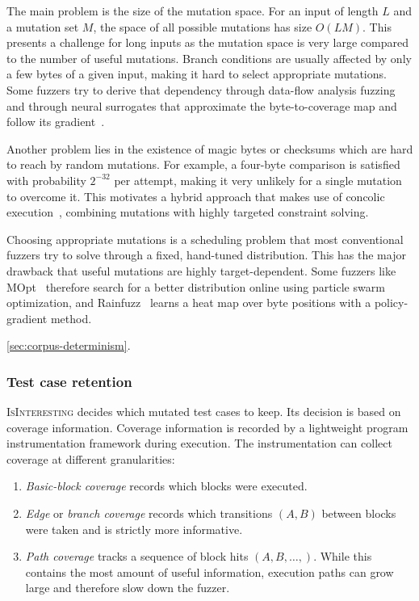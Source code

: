 The main problem is the size of the mutation space.
For an input of length $L$ and a mutation set $M$, the space of all possible mutations has size $O(LM)$.
This presents a challenge for long inputs as the mutation space is very large compared to the number of useful mutations.
Branch conditions are usually affected by only a few bytes of a given input, making it hard to select appropriate mutations.
Some fuzzers try to derive that dependency through data-flow analysis
fuzzing~\cite{gan_greyone_nodate} and through neural surrogates that approximate the
byte-to-coverage map and follow its gradient~\cite{she_neuzz_2019,she_mtfuzz_2020}.

Another problem lies in the existence of magic bytes or checksums which are hard to reach by random mutations.
For example, a four-byte comparison is satisfied with probability $2^{-32}$ per attempt, making it very unlikely for a single mutation to overcome it.
This motivates a hybrid approach that makes use of concolic execution~\cite{stephens_driller_2016}, combining mutations with highly targeted constraint solving.

Choosing appropriate mutations is a scheduling problem that most conventional fuzzers try to solve through a fixed, hand-tuned distribution.
This has the major drawback that useful mutations are highly target-dependent.
Some fuzzers like MOpt~\cite{lyu_mopt_nodate} therefore search for a better distribution online using particle swarm
optimization, and Rainfuzz~\cite{binosi_rainfuzz_2023} learns a heat map over byte positions with
a policy-gradient method.

\cref{sec:corpus-determinism}.

\subsubsection{Test case retention}

\textsc{IsInteresting} decides which mutated test cases to keep.
Its decision is based on coverage information.
Coverage information is recorded by a lightweight program instrumentation framework during execution.
The instrumentation can collect coverage at different granularities:

\begin{enumerate}
  \item \emph{Basic-block coverage}
    records which blocks were executed.

  \item \emph{Edge} or \emph{branch coverage} records which transitions $(A,B)$
    between blocks were taken and is strictly more informative.

  \item \emph{Path coverage} tracks a sequence of block hits $(A,B,\dots,)$.
    While this contains the most amount of useful information, execution paths
    can grow large and therefore slow down the fuzzer.
\end{enumerate}

